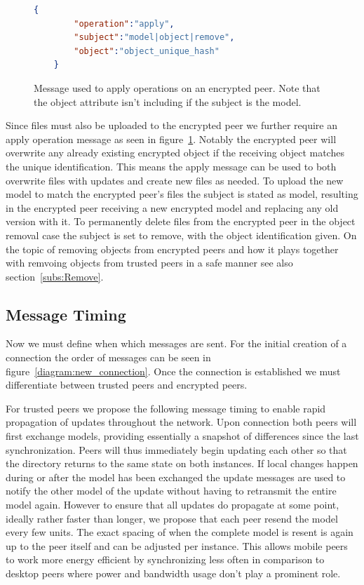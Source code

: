 \begin{figure}[htp]
    \begin{lstlisting}[language=json,firstnumber=0]
    {
        "operation":"apply",
        "subject":"model|object|remove",
        "object":"object_unique_hash"
    }
    \end{lstlisting}
\caption[Apply Message]{Message used to apply operations on an encrypted peer. Note that the object attribute isn't including if the subject is the model.}
\label{json:apply_message}
\end{figure}

Since files must also be uploaded to the encrypted peer we further require an apply operation message as seen in figure~\ref{json:apply_message}.
Notably the encrypted peer will overwrite any already existing encrypted object if the receiving object matches the unique identification.
This means the apply message can be used to both overwrite files with updates and create new files as needed.
To upload the new model to match the encrypted peer's files the subject is stated as model, resulting in the encrypted peer receiving a new encrypted model and replacing any old version with it.
To permanently delete files from the encrypted peer in the object removal case the subject is set to remove, with the object identification given.
On the topic of removing objects from encrypted peers and how it plays together with remvoing objects from trusted peers in a safe manner see also section~\ref{subs:Remove}.

\subsection{Message Timing}
\label{sub:Message Timing}

Now we must define when which messages are sent.
For the initial creation of a connection the order of messages can be seen in figure~\ref{diagram:new_connection}.
Once the connection is established we must differentiate between trusted peers and encrypted peers.

For trusted peers we propose the following message timing to enable rapid propagation of updates throughout the network.
Upon connection both peers will first exchange models, providing essentially a snapshot of differences since the last synchronization.
Peers will thus immediately begin updating each other so that the directory returns to the same state on both instances.
If local changes happen during or after the model has been exchanged the update messages are used to notify the other model of the update without having to retransmit the entire model again.
However to ensure that all updates do propagate at some point, ideally rather faster than longer, we propose that each peer resend the model every few units.
The exact spacing of when the complete model is resent is again up to the peer itself and can be adjusted per instance.
This allows mobile peers to work more energy efficient by synchronizing less often in comparison to desktop peers where power and bandwidth usage don't play a prominent role.

